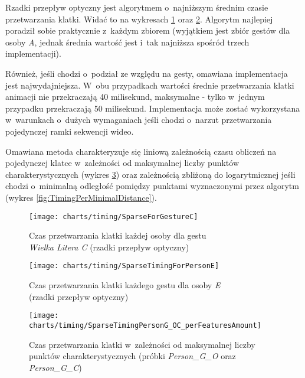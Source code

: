     \newpage
    Rzadki przepływ optyczny jest algorytmem o~najniższym średnim czasie przetwarzania klatki. Widać to na wykresach \ref{fig:SparseForGestureC} oraz \ref{fig:SparseTimingForPersonE}. Algorytm najlepiej poradził sobie praktycznie z~każdym zbiorem (wyjątkiem jest zbiór gestów dla osoby \textit{A}, jednak średnia wartość jest i~tak najniższa spośród trzech implementacji).

    Również, jeśli chodzi o~podział ze względu na gesty, omawiana implementacja jest najwydajniejsza. W~obu przypadkach wartości średnie przetwarzania klatki animacji nie przekraczają 40 milisekund, maksymalne - tylko w~jednym przypadku przekraczają 50 milisekund. Implementacja może zostać wykorzystana w~warunkach o~dużych wymaganiach jeśli chodzi o~narzut przetwarzania pojedynczej ramki sekwencji wideo.

    Omawiana metoda charakteryzuje się liniową zależnością czasu obliczeń na pojedynczej klatce w~zależności od maksymalnej liczby punktów charakterystycznych (wykres \ref{fig:TimingPerFeaturesAmount}) oraz zależnością zbliżoną do logarytmicznej jeśli chodzi o~minimalną odległość pomiędzy punktami wyznaczonymi przez algorytm (wykres \ref{fig:TimingPerMinimalDistance}).

      \begin{figure}[!ht]
        \centering
        \texttt{[image: charts/timing/SparseForGestureC]}
        \caption[Czas przetwarzania klatki każdej osoby dla gestu C (rzadki przepływ optyczny)]
                {Czas przetwarzania klatki każdej osoby dla gestu\\\textit{Wielka Litera C} (rzadki przepływ optyczny)}
        \label{fig:SparseForGestureC}
      \end{figure}

      \begin{figure}[!ht]
        \centering
        \texttt{[image: charts/timing/SparseTimingForPersonE]}
        \caption[Czas przetwarzania klatki każdego gestu dla osoby E (rzadki przepływ optyczny)]
                {Czas przetwarzania klatki każdego gestu dla osoby \textit{E}\\(rzadki przepływ optyczny)}
        \label{fig:SparseTimingForPersonE}
      \end{figure}

    \newpage
      \begin{figure}[!ht]
        \centering
        \texttt{[image: charts/timing/SparseTimingPersonG\_OC\_perFeaturesAmount]}
        \caption[Czas przetwarzania klatki w~zależności od maksymalnej liczby punktów charakterystycznych]
                {Czas przetwarzania klatki w~zależności od maksymalnej liczby punktów charakterystycznych (próbki \textit{Person\_G\_O} oraz \textit{Person\_G\_C})}
        \label{fig:TimingPerFeaturesAmount}
      \end{figure}

